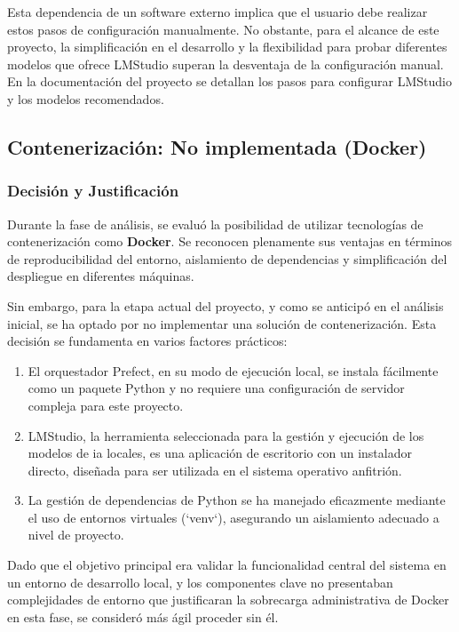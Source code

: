Esta dependencia de un software externo implica que el usuario debe realizar estos pasos de configuración manualmente. No obstante, para el alcance de este proyecto, la simplificación en el desarrollo y la flexibilidad para probar diferentes modelos que ofrece LMStudio superan la desventaja de la configuración manual. En la documentación del proyecto se detallan los pasos para configurar LMStudio y los modelos recomendados.

\subsection{Contenerización: No implementada (Docker)}
\label{subsec:decision_docker}
\subsubsection{Decisión y Justificación}
Durante la fase de análisis, se evaluó la posibilidad de utilizar tecnologías de contenerización como \textbf{Docker}. Se reconocen plenamente sus ventajas en términos de reproducibilidad del entorno, aislamiento de dependencias y simplificación del despliegue en diferentes máquinas.

Sin embargo, para la etapa actual del proyecto, y como se anticipó en el análisis inicial, se ha optado por no implementar una solución de contenerización. Esta decisión se fundamenta en varios factores prácticos:
\begin{enumerate}
    \item El orquestador Prefect, en su modo de ejecución local, se instala fácilmente como un paquete Python y no requiere una configuración de servidor compleja para este proyecto.
    \item LMStudio, la herramienta seleccionada para la gestión y ejecución de los modelos de \gls{ia} locales, es una aplicación de escritorio con un instalador directo, diseñada para ser utilizada en el sistema operativo anfitrión.
    \item La gestión de dependencias de Python se ha manejado eficazmente mediante el uso de entornos virtuales (`venv`), asegurando un aislamiento adecuado a nivel de proyecto.
\end{enumerate}
Dado que el objetivo principal era validar la funcionalidad central del sistema en un entorno de desarrollo local, y los componentes clave no presentaban complejidades de entorno que justificaran la sobrecarga administrativa de Docker en esta fase, se consideró más ágil proceder sin él.

